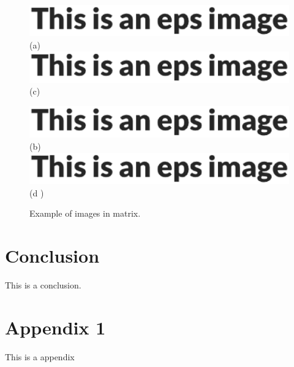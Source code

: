 \documentclass{article}
\begin{document}
    \begin{figure}[htbp] %
        \centering
        \begin{minipage}[htb]{0.45\linewidth} %
            \centering
            \includegraphics[width=\linewidth]{example.eps}
            (a)
            \includegraphics[width=\linewidth]{example.eps}
            (c)
        \end{minipage}
        \begin{minipage}[htb]{0.45\linewidth}
            \centering
            \includegraphics[width=\linewidth]{example.eps}
            (b)
            \includegraphics[width=\linewidth]{example.eps}
            (d )
        \end{minipage}
        \caption{Example of images in matrix.}
        \label{fig_3}
    \end{figure}


    \section{Conclusion}
    This is a conclusion.
    
    
    

    \appendixpage %
    \appendix
    \section{Appendix 1}
    This is a appendix

    
\end{document}
